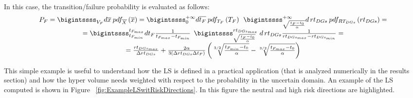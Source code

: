 In this case, the transition/failure probability is evaluated as follows:
\begin{equation}
\begin{matrix} 
P_{F} = \bigintssss_{V_{F}}d\overline{x}\: pdf_{\overline{X}}\left ( \overline{x} \right ) 
= \bigintssss_{0}^{+\infty }d\overline{t_{F}}\: pdf_{T_{F}}\left ( T_{F} \right )\: \: \bigintssss_{\sqrt{\frac{t_{F}-t_{0}}{\alpha}}}^{+\infty } d\, rt_{DGs} \: pdf_{RT_{DGs}}\left ( rt_{DGs} \right )  =
\\
= \bigintssss_{t_{F_{min}}}^{t_{F_{max}}} dt_{F}\frac{1}{t_{F_{max}}-t_{F_{min}}}\: \: \bigintssss_{\sqrt{\frac{t_{F}-t_{0}}{\alpha}}}^{ rt_{DGs_{max}}}\: d\, rt_{DGs} \frac{1}{rt_{DGs_{max}}-rt_{DGs_{min}}} =
\\
= \frac{rt_{DGs_{max}}}{\Delta rt_{DGs}} + \frac{2\alpha}{3\left ( \Delta rt_{DGs}\Delta t_{F} \right )}
\left ( \sqrt[3/2]{\frac{t_{F_{min}}-t_{0}}{\alpha}} - \sqrt[3/2]{\frac{t_{F_{max}}-t_{0}}{\alpha}} \right )
\end{matrix}
\end{equation}

This simple example is useful to understand how the LS is defined in a practical application (that is analyzed numerically in the results section) and how the hyper volume needs weighted with respect to the probability in the uncertain domain. An example of the LS computed is shown in Figure ~\ref{fig:ExampleLSwitRiskDirections}.
In this figure the neutral and high risk directions are highlighted. 

